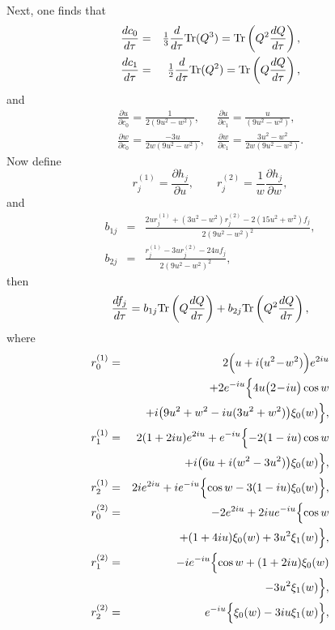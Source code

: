Next, one finds that
\begin{eqnarray}
    \frac{dc_0}{d\tau} &=& {\textstyle\frac{1}{3}}
    \frac{d}{d\tau} \mbox{Tr}(Q^3) = 
 \mbox{Tr}\left(Q^2 \frac{dQ}{d\tau}\right),\\
    \frac{dc_1}{d\tau} &=& {\textstyle\frac{1}{2}}
   \frac{d}{d\tau} \mbox{Tr} (Q^2) = 
\mbox{Tr}\left(Q \frac{dQ}{d\tau}\right),
\end{eqnarray}
and 
\begin{equation}
\begin{array}{ll}
\displaystyle\frac{\partial u}{\partial c_0}=\frac{1}{2(9u^2-w^2)}, &
\ \displaystyle \frac{\partial u}{\partial c_1}=\frac{u}{(9u^2-w^2)}, \\[5mm]
\displaystyle\frac{\partial w}{\partial c_0}=\frac{-3u}{2w(9u^2-w^2)}, &
\ \displaystyle \frac{\partial w}{\partial c_1}=\frac{3u^2-w^2}{2w(9u^2-w^2)}.
\end{array}
\end{equation}
Now define
\begin{equation}
r^{(1)}_j = \frac{\partial h_j}{\partial u},\qquad
r^{(2)}_j =\frac{1}{w}\frac{\partial h_j}{\partial w},
\end{equation}
and
\begin{eqnarray}
 b_{1j} &=& \frac{2ur_j^{(1)}+
    (3u^2\!-\!w^2)r^{(2)}_j-2(15u^2\!+\!w^2)f_j}{2(9u^2-w^2)^2},\\
 b_{2j}&=& \frac{r_j^{(1)}-3ur^{(2)}_j-24uf_j}{
   2(9u^2-w^2)^2},
\end{eqnarray}
then
\begin{equation}
 \frac{df_j}{d\tau}=b_{1j}\mbox{Tr}\left(Q\frac{dQ}{d\tau}\right)
   +b_{2j}\mbox{Tr}\left(Q^2\frac{dQ}{d\tau}\right),
\end{equation}
where
\begin{eqnarray}
r^{(1)}_0 &=& 2\Bigl(u+i(u^2\!-\!w^2)\Bigr)e^{2i u}\nonumber\\
  &&+2e^{-i u}\Bigl\{
 4u\bigl(2\!-\!i u  \bigr)\cos w \nonumber\\
  && +i\bigl(9u^2+w^2-i u( 3u^2+w^2) \bigr)\xi_0( w) 
  \Bigr\}, \\
r^{(1)}_1 &=& 2(1+2i u)e^{2i u}+e^{-i u}\Bigl\{
    -2(1-i u) \cos w \nonumber\\
  &&  +i\bigl( 6u +i(w^2-3u^2) \bigr)\xi_0( w) 
   \Bigr\}, \\
r^{(1)}_2 &=&  2i e^{2i u}+i e^{-i u}\Bigl\{
   \cos w -3 (1-i  u)  \xi_0( w)
   \Bigr\},\\
r^{(2)}_0 &=& -2e^{2i u}+2i ue^{-i u}\Bigl\{
  \cos w \nonumber\\
  && +( 1+4i u) \xi_0( w) 
  +3u^2\xi_1( w)\Bigr\}, \\
r^{(2)}_1 &=& -i e^{-i u}\Bigl\{
   \cos w  +(1+2i u)\xi_0( w)\nonumber\\ 
  &&-3u^2\xi_1( w)\Bigr\}, \\
r^{(2)}_2 &=&   e^{-i u}\Bigl\{
     \xi_0( w) 
   -3i  u \xi_1( w)\Bigr\},
\end{eqnarray}
